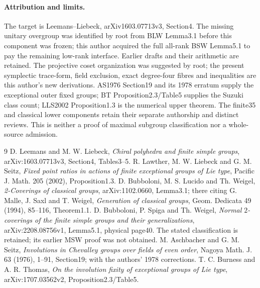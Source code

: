 \documentclass[10pt]{article}
\begin{document}
\paragraph{Attribution and limits.}
The target is Leemans--Liebeck, arXiv1603.07713v3, Section4. The missing
unitary overgroup was identified by root from BLW Lemma3.1 before this
component was frozen; this author acquired the full all-rank BSW Lemma5.1
to pay the remaining low-rank interface. Earlier drafts and their arithmetic
are retained. The projective
coset organization was suggested by root; the present symplectic trace-form,
field exclusion, exact degree-four fibres and inequalities are this author's
new derivations. AS1976 Section19 and its 1978 erratum supply the exceptional
outer fixed groups; BT Proposition2.3/Table5 supplies the Suzuki class count;
LLS2002 Proposition1.3 is the numerical upper theorem. The finite35 and
classical lower components retain their separate authorship and distinct
reviews. This is neither a proof of maximal subgroup classification nor a
whole-source admission.
\begin{thebibliography}{9}
 D. Leemans and M. W. Liebeck, \emph{Chiral polyhedra and finite
simple groups}, arXiv:1603.07713v3, Section4, Tables3--5.
 R. Lawther, M. W. Liebeck and G. M. Seitz,
\emph{Fixed point ratios in actions of finite exceptional groups of Lie type},
Pacific J. Math. 205 (2002), Proposition1.3.
 D. Bubboloni, M. S. Lucido and Th. Weigel,
\emph{2-Coverings of classical groups}, arXiv:1102.0660, Lemma3.1;
there citing G. Malle, J. Saxl and T. Weigel, \emph{Generation of classical
groups}, Geom. Dedicata 49 (1994), 85--116, Theorem1.1.
 D. Bubboloni, P. Spiga and Th. Weigel,
\emph{Normal $2$-coverings of the finite simple groups and their
generalizations}, arXiv:2208.08756v1, Lemma5.1, physical page40.
The stated classification is retained; its earlier MSW proof was not obtained.
 M. Aschbacher and G. M. Seitz, \emph{Involutions in Chevalley
groups over fields of even order}, Nagoya Math. J. 63 (1976), 1--91,
Section19; with the authors' 1978 corrections.
 T. C. Burness and A. R. Thomas, \emph{On the involution fixity
of exceptional groups of Lie type}, arXiv:1707.03562v2, Proposition2.3/Table5.
\end{thebibliography}
\end{document}
